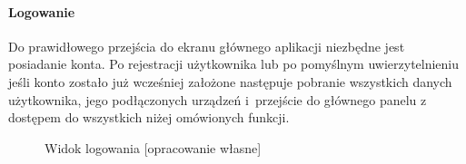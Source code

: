 \paragraph{Logowanie}
Do prawidłowego przejścia do ekranu głównego aplikacji niezbędne jest posiadanie konta. Po rejestracji użytkownika lub po pomyślnym uwierzytelnieniu jeśli konto zostało już wcześniej założone następuje pobranie wszystkich danych użytkownika, jego podłączonych urządzeń i~przejście do głównego panelu z dostępem do wszystkich niżej omówionych funkcji.
\nopagebreak
\begin{figure}[H]
   \centering
   \hfill
   \hfill
   \caption{Widok logowania [opracowanie własne]}
   \label{fig:logowanie}
\end{figure}

